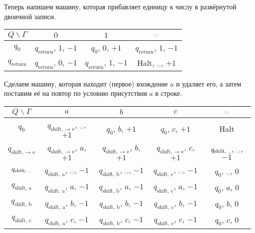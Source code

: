 \documentclass[12pt,a4paper]{article}
\newcommand{\spacesymbol}{\ensuremath{\text{\textvisiblespace}}}
\begin{document}
\begin{enumproblem}
        Теперь напишем машину, которая прибавляет единицу к числу в развёрнутой двоичной записи.
        \begin{table}[H]
            \centering
            \begin{tabular}{c||c|c|c}
                $Q\backslash\Gamma$& $0$& $1$& $\spacesymbol$\\
                \hline
                \hline
                $q_0$& $q_{\text{return}}$, $1$, $-1$& $q_0$, $0$, $+1$& $q_{\text{return}}$, $1$, $-1$\\
                \hline
                $q_{\text{return}}$& $q_{\text{return}}$, $0$, $-1$& $q_{\text{return}}$, $1$, $-1$& Halt, \spacesymbol, $+1$\\
            \end{tabular}
        \end{table}
    \end{enumproblem}

    \begin{enumproblem}
        Сделаем машину, которая находит (первое) вхождение $a$ и удаляет его, а затем поставим её на повтор по условию присутствия $a$ в строке.
        \begin{table}[H]
            \centering
            \begin{tabular}{c||c|c|c|c}
                $Q\backslash\Gamma$& $a$& $b$& $c$& \spacesymbol\\
                \hline
                \hline
                $q_0$& $q_{\text{shift, $\to$ e}}$, \spacesymbol, $+1$& $q_0$, $b$, $+1$& $q_0$, $c$, $+1$& Halt\\
                \hline
                $q_{\text{shift, $\to$ e}}$& $q_{\text{shift, $\to$ e}}$, $a$, $+1$& $q_{\text{shift, $\to$ e}}$, $b$, $+1$& $q_{\text{shift, $\to$ e}}$, $c$, $+1$& $q_{\text{shift, \spacesymbol}}$, \spacesymbol, $-1$\\
                \hline
                $q_{\text{shift, \spacesymbol}}$& $q_{\text{shift, a}}$, \spacesymbol, $-1$& $q_{\text{shift, b}}$, \spacesymbol, $-1$& $q_{\text{shift, c}}$, \spacesymbol, $-1$& $q_0$, \spacesymbol, $0$\\
                \hline
                $q_{\text{shift, a}}$& $q_{\text{shift, a}}$, $a$, $-1$& $q_{\text{shift, b}}$, $a$, $-1$& $q_{\text{shift, c}}$, $a$, $-1$& $q_0$, $a$, $0$\\
                \hline
                $q_{\text{shift, b}}$& $q_{\text{shift, a}}$, $b$, $-1$& $q_{\text{shift, b}}$, $b$, $-1$& $q_{\text{shift, c}}$, $b$, $-1$& $q_0$, $b$, $0$\\
                \hline
                $q_{\text{shift, c}}$& $q_{\text{shift, a}}$, $c$, $-1$& $q_{\text{shift, b}}$, $c$, $-1$& $q_{\text{shift, c}}$, $c$, $-1$& $q_0$, $c$, $0$\\
            \end{tabular}
        \end{table}
    \end{enumproblem}
\end{document}
